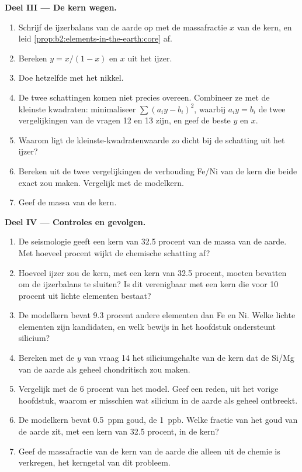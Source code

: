 \begin{problem}
\noindent\textbf{Deel III --- De kern wegen.}
\begin{enumerate}[resume]
\item Schrijf de ijzerbalans van de aarde op met de massafractie $x$ van de kern, en
leid \cref{prop:b2:elements-in-the-earth:core} af.
\item Bereken $y = x/(1-x)$ en $x$ uit het ijzer.
\item Doe hetzelfde met het nikkel.
\item De twee schattingen komen niet precies overeen. Combineer ze met de kleinste kwadraten:
minimaliseer $\sum (a_iy - b_i)^2$, waarbij $a_i y = b_i$ de twee vergelijkingen van de
vragen 12 en 13 zijn, en geef de beste $y$ en $x$.
\item Waarom ligt de kleinste-kwadratenwaarde zo dicht bij de schatting uit het ijzer?
\item Bereken uit de twee vergelijkingen de verhouding Fe/Ni van de kern die
beide exact zou maken. Vergelijk met de modelkern.
\item Geef de massa van de kern.
\end{enumerate}

\noindent\textbf{Deel IV --- Controles en gevolgen.}
\begin{enumerate}[resume]
\item De seismologie geeft een kern van 32.5 procent van de massa van de aarde. Met hoeveel
procent wijkt de chemische schatting af?
\item Hoeveel ijzer zou de kern, met een kern van 32.5 procent, moeten bevatten om
de ijzerbalans te sluiten? Is dit verenigbaar met een kern die voor 10 procent uit lichte
elementen bestaat?
\item De modelkern bevat 9.3 procent andere elementen dan Fe en Ni. Welke
lichte elementen zijn kandidaten, en welk bewijs in het hoofdstuk ondersteunt silicium?
\item Bereken met de $y$ van vraag 14 het siliciumgehalte van de kern dat
de Si/Mg van de aarde als geheel chondritisch zou maken.
\item Vergelijk met de 6 procent van het model. Geef een reden, uit het vorige
hoofdstuk, waarom er misschien wat silicium in de aarde als geheel ontbreekt.
\item De modelkern bevat \qty{0.5}{ppm} goud, de 
\qty{1}{ppb}. Welke fractie van het goud van de aarde zit, met een kern van 32.5 procent,
in de kern?
\item Geef de massafractie van de kern van de aarde die alleen uit de chemie is verkregen,
het kerngetal van dit probleem.
\end{enumerate}
\end{problem}
